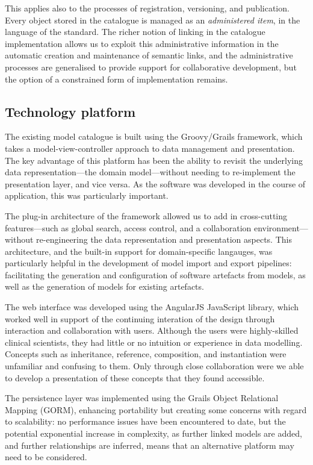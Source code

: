 This applies also to the processes of registration, versioning, and
publication.  Every object stored in the catalogue is managed as an
\emph{administered item}, in the language of the standard.  The richer
notion of linking in the catalogue implementation allows us to exploit
this administrative information in the automatic creation and
maintenance of semantic links, and the administrative processes are
generalised to provide support for collaborative development, but the
option of a constrained form of implementation remains. 

\subsection{Technology platform}

The existing model catalogue is built using the Groovy/Grails
framework, which takes a model-view-controller approach to data
management and presentation.  The key advantage of this platform has
been the ability to revisit the underlying data representation---the
domain model---without needing to re-implement the presentation
layer, and vice versa.  As the software was developed in the course of
application, this was particularly important. 

The plug-in architecture of the framework allowed us to add in
cross-cutting features---such as global search, access control, and a
collaboration environment---without re-engineering the data
representation and presentation aspects.  This architecture, and the
built-in support for domain-specific langauges, was particularly
helpful in the development of model import and export pipelines: 
facilitating the generation and configuration of software artefacts
from models, as well as the generation of models for existing
artefacts.

The web interface was developed using the AngularJS JavaScript
library, which worked well in support of the continuing interation of
the design through interaction and collaboration with users.  Although
the users were highly-skilled clinical scientists, they had little or
no intuition or experience in data modelling.  Concepts such as
inheritance, reference, composition, and instantiation were unfamiliar
and confusing to them.  Only through close collaboration were we able
to develop a presentation of these concepts that they found
accessible.

The persistence layer was implemented using the Grails Object
Relational Mapping (GORM), enhancing portability but creating some
concerns with regard to scalability: no performance issues have been
encountered to date, but the potential exponential increase in
complexity, as further linked models are added, and further
relationships are inferred, means that an alternative platform may
need to be considered. 

